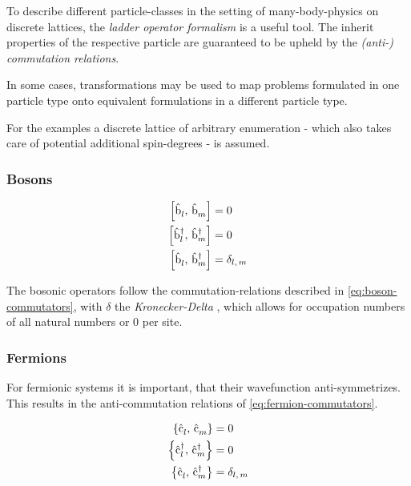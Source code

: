 To describe different particle-classes in the setting of many-body-physics on discrete lattices, the \emph{ladder operator formalism} is a useful tool. 
The inherit properties of the respective particle are guaranteed to be upheld by the \emph{(anti-) commutation relations}.

In some cases, transformations may be used to map problems formulated in one particle type onto equivalent formulations in a different particle type.

For the examples a discrete lattice of arbitrary enumeration - which also takes care of potential additional spin-degrees - is assumed.

\subsubsection*{Bosons}

\begin{equation}
    \label{eq:boson-commutators}
    \begin{split}
        \left[\hat{\text{b}}^{ }_{l},\,\hat{\text{b}}^{ }_{m}\right] &= 0\\
        \left[\hat{\text{b}}^{\dagger }_{l},\,\hat{\text{b}}^{\dagger }_{m}\right] &= 0\\
        \left[\hat{\text{b}}^{ }_{l},\,\hat{\text{b}}^{\dagger }_{m}\right] &= \delta_{l,\,m}\\
    \end{split}
\end{equation}

The bosonic operators follow the commutation-relations described in \autoref{eq:boson-commutators}, with $\delta$ the \emph{Kronecker-Delta} \cite{schwablBookII}, which allows for occupation numbers of all natural numbers or $0$ per site.

\subsubsection*{Fermions}

For fermionic systems it is important, that their wavefunction anti-symmetrizes. This results in the anti-commutation relations of  \autoref{eq:fermion-commutators}.

\begin{equation}
    \label{eq:fermion-commutators}
    \begin{split}
        \left\{\hat{\text{c}}^{ }_{l},\,\hat{\text{c}}^{ }_{m}\right\} &= 0\\
        \left\{\hat{\text{c}}^{\dagger }_{l},\,\hat{\text{c}}^{\dagger }_{m}\right\} &= 0\\
        \left\{\hat{\text{c}}^{ }_{l},\,\hat{\text{c}}^{\dagger }_{m}\right\} &= \delta_{l,\,m}\\
    \end{split}
\end{equation}


